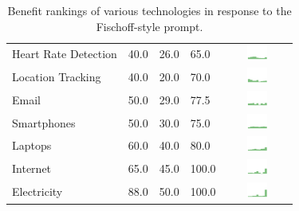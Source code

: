 \begin{table}[t]
\begin{center}
\begin{tabular}{| p{2.6cm} | p{.8cm} | p{.8cm} | p{.8cm} | c |}
Heart Rate Detection & 40.0 & 26.0 & 65.0 & \includegraphics[width = 2cm, height = 0.5cm]{tex-inputs/table-images/heartratedetectionben} \\ 
Location Tracking & 40.0 & 20.0 & 70.0 & \includegraphics[width = 2cm, height = 0.5cm]{tex-inputs/table-images/locationtrackingben} \\ 
Email & 50.0 & 29.0 & 77.5 & \includegraphics[width = 2cm, height = 0.5cm]{tex-inputs/table-images/emailben} \\ 
Smartphones & 50.0 & 30.0 & 75.0 & \includegraphics[width = 2cm, height = 0.5cm]{tex-inputs/table-images/smartphonesben} \\ 
Laptops & 60.0 & 40.0 & 80.0 & \includegraphics[width = 2cm, height = 0.5cm]{tex-inputs/table-images/laptopsben} \\ 
Internet & 65.0 & 45.0 & 100.0 & \includegraphics[width = 2cm, height = 0.5cm]{tex-inputs/table-images/internetben} \\ 
Electricity & 88.0 & 50.0 & 100.0 & \includegraphics[width = 2cm, height = 0.5cm]{tex-inputs/table-images/ElectricityBenefit} \\ 
\hline
\end{tabular}
\caption{Benefit rankings of various technologies in response to the Fischoff-style prompt. }
\label{benefit}
\end{center}
\end{table}
